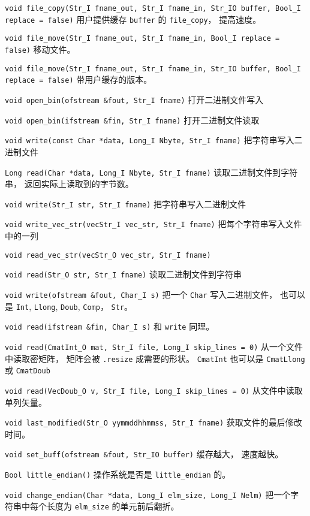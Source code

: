 \verb`void file_copy(Str_I fname_out, Str_I fname_in, Str_IO buffer, Bool_I replace = false)` 用户提供缓存 \verb`buffer` 的 \verb`file_copy`， 提高速度。

\verb`void file_move(Str_I fname_out, Str_I fname_in, Bool_I replace = false)` 移动文件。

\verb`void file_move(Str_I fname_out, Str_I fname_in, Str_IO buffer, Bool_I replace = false)` 带用户缓存的版本。

\verb`void open_bin(ofstream &fout, Str_I fname)` 打开二进制文件写入

\verb`void open_bin(ifstream &fin, Str_I fname)` 打开二进制文件读取

\verb`void write(const Char *data, Long_I Nbyte, Str_I fname)` 把字符串写入二进制文件

\verb`Long read(Char *data, Long_I Nbyte, Str_I fname)` 读取二进制文件到字符串， 返回实际上读取到的字节数。

\verb`void write(Str_I str, Str_I fname)` 把字符串写入二进制文件

\verb`void write_vec_str(vecStr_I vec_str, Str_I fname)` 把每个字符串写入文件中的一列

\verb`void read_vec_str(vecStr_O vec_str, Str_I fname)`

\verb`void read(Str_O str, Str_I fname)` 读取二进制文件到字符串

\verb`void write(ofstream &fout, Char_I s)` 把一个 \verb`Char` 写入二进制文件， 也可以是 \verb`Int`, \verb`Llong`, \verb`Doub`, \verb`Comp`， \verb`Str`。

\verb`void read(ifstream &fin, Char_I s)` 和 \verb`write` 同理。

\verb`void read(CmatInt_O mat, Str_I file, Long_I skip_lines = 0)` 从一个文件中读取密矩阵， 矩阵会被 \verb`.resize` 成需要的形状。 \verb`CmatInt` 也可以是 \verb`CmatLlong` 或 \verb`CmatDoub`

\verb`void read(VecDoub_O v, Str_I file, Long_I skip_lines = 0)` 从文件中读取单列矢量。

\verb`void last_modified(Str_O yymmddhhmmss, Str_I fname)` 获取文件的最后修改时间。

\verb`void set_buff(ofstream &fout, Str_IO buffer)` 缓存越大， 速度越快。

\verb`Bool little_endian()` 操作系统是否是 \verb`little_endian` 的。

\verb`void change_endian(Char *data, Long_I elm_size, Long_I Nelm)` 把一个字符串中每个长度为 \verb`elm_size` 的单元前后翻折。
